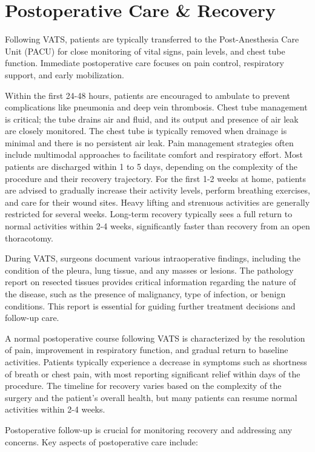 \section*{Postoperative Care \& Recovery}
Following VATS, patients are typically transferred to the Post-Anesthesia Care Unit (PACU) for close monitoring of vital signs, pain levels, and chest tube function. Immediate postoperative care focuses on pain control, respiratory support, and early mobilization.

Within the first 24-48 hours, patients are encouraged to ambulate to prevent complications like pneumonia and deep vein thrombosis. Chest tube management is critical; the tube drains air and fluid, and its output and presence of air leak are closely monitored. The chest tube is typically removed when drainage is minimal and there is no persistent air leak. Pain management strategies often include multimodal approaches to facilitate comfort and respiratory effort. Most patients are discharged within 1 to 5 days, depending on the complexity of the procedure and their recovery trajectory. For the first 1-2 weeks at home, patients are advised to gradually increase their activity levels, perform breathing exercises, and care for their wound sites. Heavy lifting and strenuous activities are generally restricted for several weeks. Long-term recovery typically sees a full return to normal activities within 2-4 weeks, significantly faster than recovery from an open thoracotomy.

During VATS, surgeons document various intraoperative findings, including the condition of the pleura, lung tissue, and any masses or lesions. The pathology report on resected tissues provides critical information regarding the nature of the disease, such as the presence of malignancy, type of infection, or benign conditions. This report is essential for guiding further treatment decisions and follow-up care.

A normal postoperative course following VATS is characterized by the resolution of pain, improvement in respiratory function, and gradual return to baseline activities. Patients typically experience a decrease in symptoms such as shortness of breath or chest pain, with most reporting significant relief within days of the procedure. The timeline for recovery varies based on the complexity of the surgery and the patient's overall health, but many patients can resume normal activities within 2-4 weeks.

Postoperative follow-up is crucial for monitoring recovery and addressing any concerns. Key aspects of postoperative care include:

